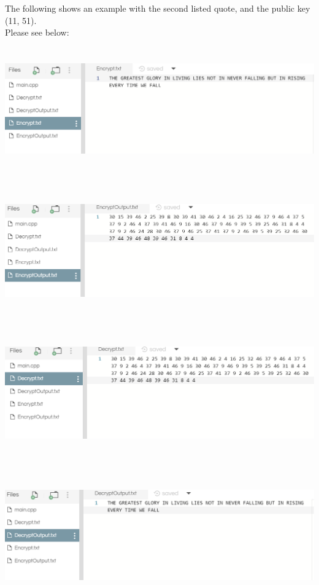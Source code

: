 \documentclass{article}
\begin{document}
\begin{solution}
\vskip 0.5in
The following shows an example with the second listed quote, and the public key (11, 51).\\
Please see below:\\
\includegraphics[width=16cm, height=6cm]{7.png}\\
\includegraphics[width=16cm, height=6cm]{8.png}\\
\includegraphics[width=16cm, height=6cm]{9.png}\\
\includegraphics[width=16cm, height=6cm]{10.png}\\

\end{solution}
\end{document}
